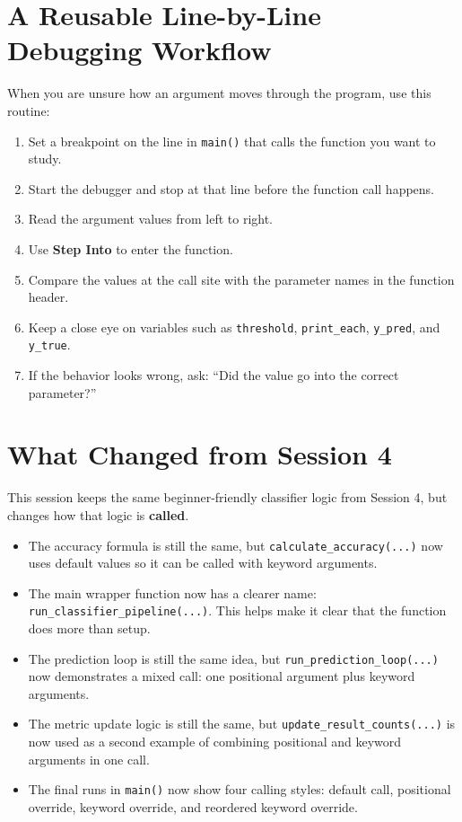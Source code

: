 



\section{A Reusable Line-by-Line Debugging Workflow}
\begin{tcolorbox}[title=Line-by-Line Debugging Workflow]
When you are unsure how an argument moves through the program, use this routine:
\begin{enumerate}
    \item Set a breakpoint on the line in \texttt{main()} that calls the function you want to study.
    \item Start the debugger and stop at that line before the function call happens.
    \item Read the argument values from left to right.
    \item Use \textbf{Step Into} to enter the function.
    \item Compare the values at the call site with the parameter names in the function header.
    \item Keep a close eye on variables such as \texttt{threshold}, \texttt{print\_each}, \texttt{y\_pred}, and \texttt{y\_true}.
    \item If the behavior looks wrong, ask: ``Did the value go into the correct parameter?''
\end{enumerate}
\end{tcolorbox}

\section{What Changed from Session 4}

This session keeps the same beginner-friendly classifier logic from Session 4, but changes how that logic is \textbf{called}.

\begin{itemize}
    \item The accuracy formula is still the same, but \texttt{calculate\_accuracy(...)} now uses default values so it can be called with keyword arguments.
    \item The main wrapper function now has a clearer name: \texttt{run\_classifier\_pipeline(...)}. This helps make it clear that the function does more than setup.
    \item The prediction loop is still the same idea, but \texttt{run\_prediction\_loop(...)} now demonstrates a mixed call: one positional argument plus keyword arguments.
    \item The metric update logic is still the same, but \texttt{update\_result\_counts(...)} is now used as a second example of combining positional and keyword arguments in one call.
    \item The final runs in \texttt{main()} now show four calling styles: default call, positional override, keyword override, and reordered keyword override.
\end{itemize}

